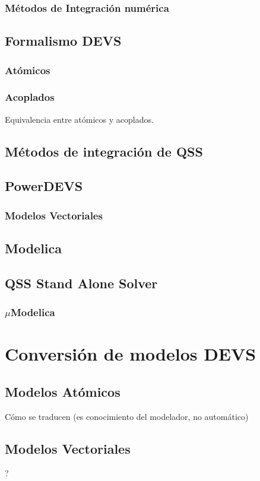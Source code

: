 \documentclass[a4paper,	11pt]{article}
\begin{document}
\subsubsection{Métodos de Integración numérica}
\subsection{Formalismo DEVS}
\subsubsection{Atómicos }
\subsubsection{Acoplados}
Equivalencia entre atómicos y acoplados.

\subsection {Métodos de integración de QSS}
\subsection {PowerDEVS}
\subsubsection{Modelos Vectoriales}
\subsection{Modelica}
\subsection{QSS Stand Alone Solver}
\subsubsection{$\mu$Modelica}

\section{Conversión de modelos DEVS}
\subsection{Modelos Atómicos}
Cómo se traducen (es conocimiento del modelador, no automático)
\subsection{Modelos Vectoriales}
?
\end{document}

